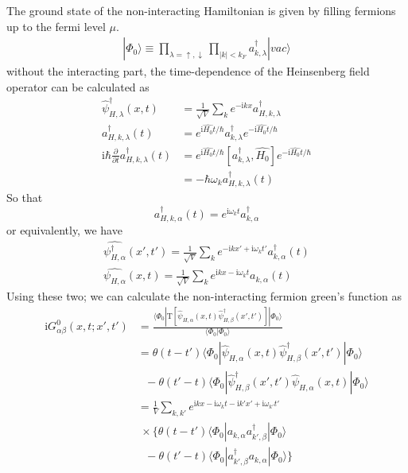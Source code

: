 The ground state of the non-interacting Hamiltonian is given by filling fermions up to the fermi level $\mu$.
\begin{align}
|\Phi_0\rangle \equiv \prod_{\lambda=\uparrow,\downarrow}\prod_{|k|<k_F} a^{\dagger}_{k,\lambda}|vac\rangle \nonumber
\end{align}
without the interacting  part, the time-dependence of the Heinsenberg field operator can be calculated as
\begin{align}
\hat\psi^{\dagger}_{H,\lambda}(x,t)&=\frac{1}{\sqrt{V}}\sum_{k}e^{-\mathrm{i}kx}a_{H,k,\lambda}^{\dagger}\nonumber \\
a_{H,k,\lambda}^{\dagger}(t)&=e^{\mathrm{i}\hat{H_0}t/\hbar}a_{k,\lambda}^{\dagger}e^{-\mathrm{i}\hat{H_0}t/\hbar}\nonumber \\
\mathrm{i}\hbar \frac{\partial}{\partial  t} a_{H,k,\lambda}^{\dagger}(t)&=e^{\mathrm{i}\hat{H_0}t/\hbar}[a_{k,\lambda}^{\dagger},\hat{H_0}]e^{-\mathrm{i}\hat{H_0}t/\hbar}\nonumber \\
&=-\hbar \omega_k a_{H,k,\lambda}^{\dagger}(t) \nonumber
\end{align}
So that
\begin{equation}
a^{\dagger}_{H,k,\alpha}(t)=e^{\mathrm{i}\omega_{k}t}a^{\dagger}_{k,\alpha} \nonumber
\end{equation}
or equivalently, we have 
\begin{align}\label{2.3.5}
\hat{\psi_{H,\alpha}^{\dagger}}(x',t')=\frac{1}{\sqrt{V}}\sum_{k}e^{-\mathrm{i}kx'+\mathrm{i}\omega_kt'}a^{\dagger}_{k,\alpha}(t) \nonumber \\
\hat{\psi_{H,\alpha}}(x,t)=\frac{1}{\sqrt{V}}\sum_{k}e^{\mathrm{i}kx-\mathrm{i}\omega_kt}a_{k,\alpha}(t)
\end{align}
Using these two; we can calculate the non-interacting fermion green's function as
\begin{align}
\mathrm{i}G^0_{\alpha\beta}(x,t;x',t')&=\frac{\langle\Phi_0|\mathrm{T}[\hat \psi_{H,\alpha}(x,t)\hat \psi^\dagger_{H,\beta} (x',t')]|\Phi_0\rangle}{\langle\Phi_0|\Phi_0\rangle} \nonumber \\
&=\theta(t-t')\langle\Phi_0|\hat \psi_{H,\alpha}(x,t)\hat \psi^{
\dagger}_{H,\beta} (x',t')|\Phi_0\rangle \nonumber \\
& \ \ \ -\theta(t'-t)\langle\Phi_0|\hat \psi^{
\dagger}_{H,\beta}(x',t')\hat \psi_{H,\alpha} (x,t)|\Phi_0\rangle \nonumber \\
&=\frac{1}{V}\sum_{k,k'}e^{\mathrm{i}kx-\mathrm{i}\omega_kt-\mathrm{i}k'x'+\mathrm{i}\omega_{k'}t'} \nonumber \\
&\  \times\{\theta(t-t')\langle\Phi_0|a_{k,\alpha}a^{\dagger}_{k',\beta}|\Phi_0\rangle \nonumber \\
& \ \ \ -\theta(t'-t)\langle\Phi_0|a^{\dagger}_{k',\beta}a_{k,\alpha}|\Phi_0\rangle \} \nonumber 
\end{align}

